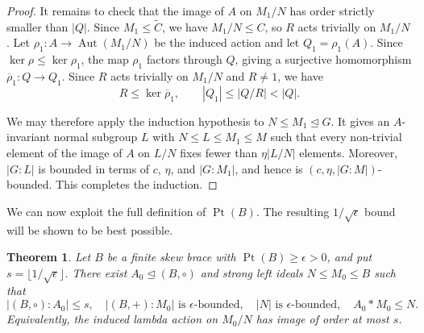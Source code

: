 \documentclass[10pt,a4paper]{amsart}
\numberwithin{equation}{section}
\newtheorem{thm}[equation]{Theorem}
\newcommand{\Pt}{\operatorname{Pt} }
\newcommand{\Aut}{\operatorname{Aut} }
\begin{document}
\begin{proof}
It remains to check that the image of $A$ on $M_1/N$ has order strictly smaller than $|Q|$. Since $M_1\leqslant\widetilde C$, we have $M_1/N\leqslant C$, so $R$ acts trivially on $M_1/N$. Let $\rho_1:A\to\Aut(M_1/N)$ be the induced action and let $Q_1=\rho_1(A)$. Since $\ker\rho\leqslant\ker\rho_1$, the map $\rho_1$ factors through $Q$, giving a surjective homomorphism $\overline\rho_1:Q\to Q_1$. Since $R$ acts trivially on $M_1/N$ and $R\neq 1$, we have
$$
R\leqslant\ker\overline\rho_1,
\qquad
|Q_1|\leqslant |Q/R|<|Q|.
$$

We may therefore apply the induction hypothesis to $N\leqslant M_1\unlhd G$. It gives an $A$-invariant normal subgroup $L$ with $N\leqslant L\leqslant M_1\leqslant M$ such that every non-trivial element of the image of $A$ on $L/N$ fixes fewer than $\eta|L/N|$ elements. Moreover, $|G:L|$ is bounded in terms of $c$, $\eta$, and $|G:M_1|$, and hence is $(c,\eta,|G:M|)$-bounded. This completes the induction.
\end{proof}




We can now exploit the full definition of $\Pt(B)$. The resulting
$1/\sqrt{\epsilon}$ bound will be shown to be best possible.

\begin{thm}\label{thm:Pt-optimal}
Let $B$ be a finite skew brace with $\Pt(B)\geqslant\epsilon>0$, and put
$s=\lfloor1/\sqrt{\epsilon}\rfloor$. There exist
$A_0\unlhd(B,\circ)$ and strong left ideals $N\leqslant M_0\leqslant B$
such that
$$
|(B,\circ):A_0|\leqslant s,\quad
|(B,+):M_0|\text{ is $\epsilon$-bounded},\quad
|N|\text{ is $\epsilon$-bounded},\quad
A_0*M_0\leqslant N.
$$
Equivalently, the induced lambda action on $M_0/N$ has image of order
at most $s$.
\end{thm}
\end{document}
